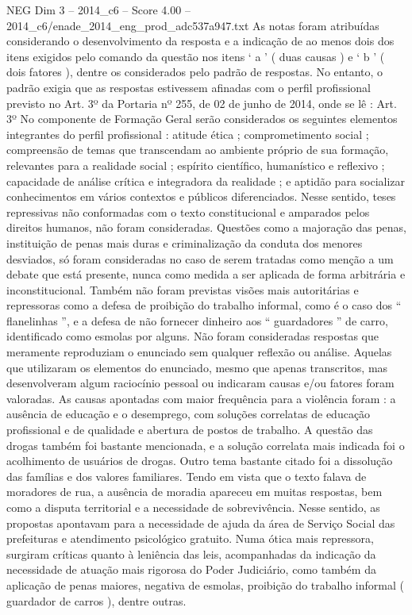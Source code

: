 \begin{textsample}{NEG Dim 3 – 2014\_c6 – Score 4.00 – 2014\_c6/enade\_2014\_eng\_prod\_adc537a947.txt}
As notas foram atribuídas considerando o desenvolvimento da resposta e a indicação de ao menos dois dos itens exigidos pelo comando da questão nos itens ‘ a ’ ( duas causas ) e ‘ b ’ ( dois fatores ), dentre os considerados pelo padrão de respostas.
No entanto, o padrão exigia que as respostas estivessem afinadas com o perfil profissional previsto no Art. 3º da Portaria nº 255, de 02 de junho de 2014, onde se lê : Art. 3º No componente de Formação Geral serão considerados os seguintes elementos integrantes do perfil profissional : atitude ética ; comprometimento social ; compreensão de temas que transcendam ao ambiente próprio de sua formação, relevantes para a realidade social ; espírito científico, humanístico e reflexivo ; capacidade de análise crítica e integradora da realidade ; e aptidão para socializar conhecimentos em vários contextos e públicos diferenciados.
Nesse sentido, teses repressivas não conformadas com o texto constitucional e amparados pelos direitos humanos, não foram consideradas.
Questões como a majoração das penas, instituição de penas mais duras e criminalização da conduta dos menores desviados, só foram consideradas no caso de serem tratadas como menção a um debate que está presente, nunca como medida a ser aplicada de forma arbitrária e inconstitucional.
Também não foram previstas visões mais autoritárias e repressoras como a defesa de proibição do trabalho informal, como é o caso dos “ flanelinhas ”, e a defesa de não fornecer dinheiro aos “ guardadores ” de carro, identificado como esmolas por alguns.
Não foram consideradas respostas que meramente reproduziam o enunciado sem qualquer reflexão ou análise.
Aquelas que utilizaram os elementos do enunciado, mesmo que apenas transcritos, mas desenvolveram algum raciocínio pessoal ou indicaram causas e/ou fatores foram valoradas.
As causas apontadas com maior frequência para a violência foram : a ausência de educação e o desemprego, com soluções correlatas de educação profissional e de qualidade e abertura de postos de trabalho.
A questão das drogas também foi bastante mencionada, e a solução correlata mais indicada foi o acolhimento de usuários de drogas.
Outro tema bastante citado foi a dissolução das famílias e dos valores familiares.
Tendo em vista que o texto falava de moradores de rua, a ausência de moradia apareceu em muitas respostas, bem como a disputa territorial e a necessidade de sobrevivência.
Nesse sentido, as propostas apontavam para a necessidade de ajuda da área de Serviço Social das prefeituras e atendimento psicológico gratuito.
Numa ótica mais repressora, surgiram críticas quanto à leniência das leis, acompanhadas da indicação da necessidade de atuação mais rigorosa do Poder Judiciário, como também da aplicação de penas maiores, negativa de esmolas, proibição do trabalho informal ( guardador de carros ), dentre outras.

\end{textsample}
